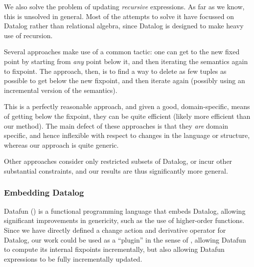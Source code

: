 We also solve the problem of updating \emph{recursive} expressions. As far as we
know, this is unsolved in general. Most of the attempts to solve it have
focussed on Datalog rather than relational algebra, since Datalog is designed to
make heavy use of recursion. 

Several approaches
\parencites{gupta1993maintaining}{harrison1992maintenance}
make use of a common tactic: one can get to the new fixed
point by starting from \emph{any} point below it, and then iterating the
semantics again to fixpoint. The approach, then, is to find a way to delete as
few tuples as possible to get below the new fixpoint, and then iterate again
(possibly using an incremental version of the semantics).

This is a perfectly reasonable approach, and given a good, domain-specific,
means of getting below the fixpoint, they can be quite efficient (likely more
efficient than our method). The main defect of these approaches is that they
\emph{are} domain specific, and hence inflexible with respect to changes in the
language or structure, whereas our approach is quite generic.

Other approaches \parencites{dong2000incremental}{urpi1992method} consider only
restricted subsets of Datalog, or incur other substantial constraints, and our results
are thus significantly more general.

\subsubsection{Embedding Datalog}
\label{sec:embeddingDatalog}

Datafun (\textcite{arntz2016datafun}) is a functional programming language that embeds
Datalog, allowing significant improvements in genericity, such as the use of
higher-order functions. Since we have directly defined a change action and
derivative operator for Datalog, our work could be used as a ``plugin'' in the sense
of \citeauthor{cai2014changes}, allowing Datafun to compute its internal fixpoints
incrementally, but also allowing Datafun expressions to be fully incrementally updated.

\printbibliography


